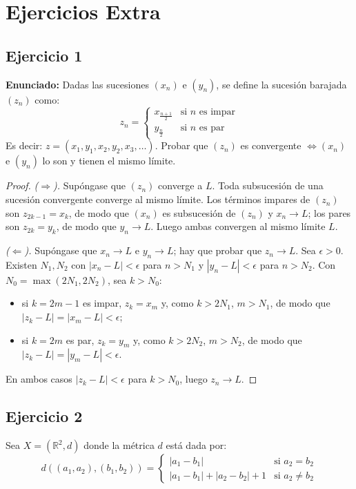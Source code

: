 \documentclass[11pt, a4paper]{article}
\begin{document}
\newpage

\section{Ejercicios Extra}
\subsection*{Ejercicio 1}

\textbf{Enunciado:}
Dadas las sucesiones $(x_n)$ e $(y_n)$, se define la sucesión barajada $(z_n)$ como:
$$ z_n = \begin{cases} x_{\frac{n+1}{2}} & \text{si } n \text{ es impar} \\ y_{\frac{n}{2}} &
\text{si } n \text{ es par} \end{cases} $$
Es decir: $z = (x_1, y_1, x_2, y_2, x_3, \dots)$.
Probar que $(z_n)$ es convergente $\iff (x_n)$ e $(y_n)$ lo son y tienen el mismo límite.

\begin{proof}
\textit{($\Rightarrow$).} Supóngase que $(z_n)$ converge a $L$. Toda subsucesión de una sucesión
convergente converge al mismo límite. Los términos impares de $(z_n)$ son $z_{2k-1} = x_k$, de modo que
$(x_n)$ es subsucesión de $(z_n)$ y $x_n \to L$; los pares son $z_{2k} = y_k$, de modo que $y_n \to L$.
Luego ambas convergen al mismo límite $L$.

\textit{($\Leftarrow$).} Supóngase que $x_n \to L$ e $y_n \to L$; hay que probar que $z_n \to L$. Sea
$\epsilon > 0$. Existen $N_1, N_2$ con $|x_n - L| < \epsilon$ para $n > N_1$ y $|y_n - L| < \epsilon$
para $n > N_2$. Con $N_0 = \max(2N_1, 2N_2)$, sea $k > N_0$:
\begin{itemize}
    \item si $k = 2m - 1$ es impar, $z_k = x_m$ y, como $k > 2N_1$, $m > N_1$, de modo que
    $|z_k - L| = |x_m - L| < \epsilon$;
    \item si $k = 2m$ es par, $z_k = y_m$ y, como $k > 2N_2$, $m > N_2$, de modo que
    $|z_k - L| = |y_m - L| < \epsilon$.
\end{itemize}
En ambos casos $|z_k - L| < \epsilon$ para $k > N_0$, luego $z_n \to L$.
\end{proof}

\subsection*{Ejercicio 2}

Sea $X = (\mathbb{R}^2, d)$ donde la métrica $d$ está dada por:
$$ d((a_1, a_2), (b_1, b_2)) = \begin{cases} |a_1 - b_1| & \text{si } a_2 = b_2 \\ |a_1 - b_1| +
|a_2 - b_2| + 1 & \text{si } a_2 \neq b_2 \end{cases} $$
\end{document}
